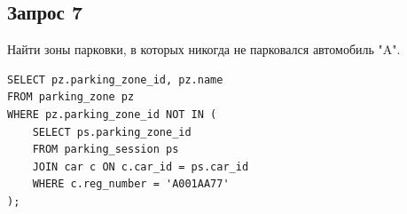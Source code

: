 
\newpage

\subsection{Запрос 7}
Найти зоны парковки, в которых никогда не парковался автомобиль "A".
\begin{lstlisting}[style=sqlstyle, caption={Запрос 7}, label={lst:req7}]
SELECT pz.parking_zone_id, pz.name
FROM parking_zone pz
WHERE pz.parking_zone_id NOT IN (
    SELECT ps.parking_zone_id
    FROM parking_session ps
    JOIN car c ON c.car_id = ps.car_id
    WHERE c.reg_number = 'А001АА77'
);
\end{lstlisting}

